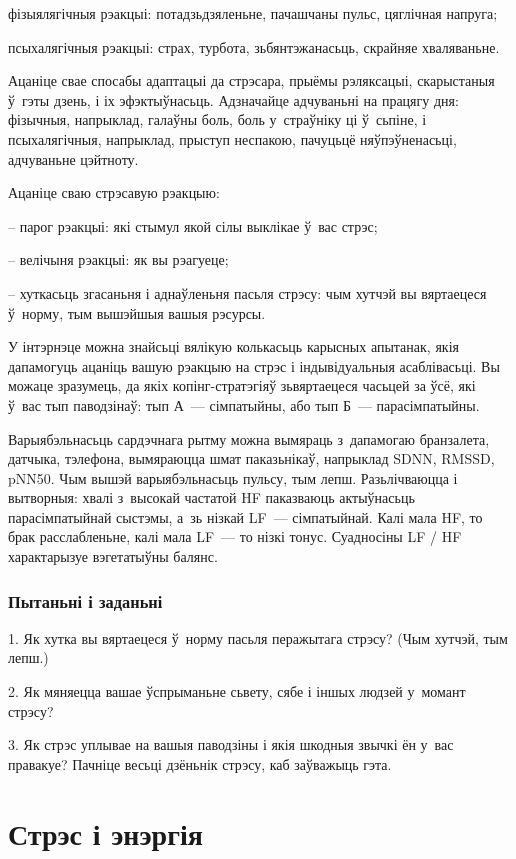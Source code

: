 фізыялягічныя рэакцыі: потадзьдзяленьне, пачашчаны пульс, цяглічная напруга;

псыхалягічныя рэакцыі: страх, турбота, зьбянтэжанасьць, скрайняе хваляваньне. 

Ацаніце свае спосабы адаптацыі да стрэсара, прыёмы рэляксацыі, скарыстаныя ў~гэты дзень, і іх эфэктыўнасьць. Адзначайце адчуваньні на працягу дня: фізычныя, напрыклад, галаўны боль, боль у~страўніку ці ў~сьпіне, і псыхалягічныя, напрыклад, прыступ неспакою, пачуцьцё няўпэўненасьці, адчуваньне цэйтноту.

Ацаніце сваю стрэсавую рэакцыю:

– парог рэакцыі: які стымул якой сілы выклікае ў~вас стрэс;

– велічыня рэакцыі: як вы рэагуеце;

– хуткасьць згасаньня і аднаўленьня пасьля стрэсу: чым хутчэй вы вяртаецеся ў~норму, тым вышэйшыя вашыя рэсурсы.

У інтэрнэце можна знайсьці вялікую колькасьць карысных апытанак, якія дапамогуць ацаніць вашую рэакцыю на стрэс і індывідуальныя асаблівасьці. Вы можаце зразумець, да якіх копінг-стратэгіяў зьвяртаецеся часьцей за ўсё, які ў~вас тып паводзінаў: тып А~--- сімпатыйны, або тып Б~--- парасімпатыйны.

Варыябэльнасьць сардэчнага рытму можна вымяраць з~дапамогаю бранзалета, датчыка, тэлефона, вымяраюцца шмат паказьнікаў, напрыклад SDNN, RMSSD, pNN50. Чым вышэй варыябэльнасьць пульсу, тым лепш. Разьлічваюцца і вытворныя: хвалі з~высокай частатой HF паказваюць актыўнасьць парасімпатыйнай сыстэмы, а~зь нізкай LF~--- сімпатыйнай. Калі мала HF, то брак расслабленьне, калі мала LF~--- то нізкі тонус. Суадносіны LF / HF характарызуе вэгетатыўны балянс.

\subsubsection{Пытаньні і заданьні}

1. Як хутка вы вяртаецеся ў~норму пасьля перажытага стрэсу? (Чым хутчэй, тым лепш.)

2. Як мяняецца вашае ўспрыманьне сьвету, сябе і іншых людзей у~момант стрэсу?

3. Як стрэс уплывае на вашыя паводзіны і якія шкодныя звычкі ён у~вас правакуе? Пачніце весьці дзёньнік стрэсу, каб заўважыць гэта.


\section{Стрэс і энэргія}

